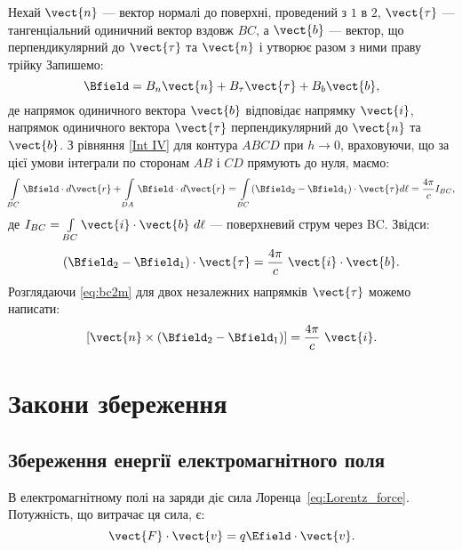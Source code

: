 Нехай $\vect{n}$ --- вектор нормалі до поверхні, проведений з $1$ в $2$,  $\vect{\tau}$ --- тангенціальний одиничний вектор вздовж $BC$, а $\vect{b}$
--- вектор, що перпендикулярний до $\vect{\tau}$ та $\vect{n}$ і утворює разом з ними праву трійку
Запишемо:
\begin{equation*}
    \Bfield = B_n\vect{n} + B_{\tau}\vect{\tau} + B_b\vect{b},
\end{equation*}
де напрямок одиничного вектора $\vect{b}$ відповідає напрямку $\vect{i}$, напрямок
одиничного вектора $\vect{\tau}$ перпендикулярний до $\vect{n}$ та $\vect{b}$.
З рівняння \eqref {Int IV} для контура $ABCD$ при $h \to 0$, враховуючи, що за цієї
умови інтеграли по сторонам $AB$ і $CD$ прямують до нуля, маємо:
\begin{equation*}
    \int\limits_{BC} \Bfield\cdot d\vect{r} + \int\limits_{DA} \Bfield\cdot d\vect{r} = \int\limits_{BC} (\Bfield_2 - \Bfield_1)\cdot\vect{\tau} d\ell =
    \frac{4\pi}c I_{BC},
\end{equation*}
де $I_{BC} = \int\limits_{BC} \vect{i}\cdot\vect{b}\ d\ell$ --- поверхневий струм через BC. Звідси:
\begin{equation}\label{eq:bc2m}
    (\Bfield_2 - \Bfield_1)\cdot\vect{\tau} = \frac{4\pi}c\ \vect{i}\cdot\vect{b}.
\end{equation}
Розглядаючи \eqref{eq:bc2m} для двох незалежних напрямків $\vect{\tau}$ можемо написати:
\begin{equation}\label{eq:bc2m2}
    \left[ \vect{n}\times(\Bfield_2 - \Bfield_1)\right]  = \frac{4\pi}c\ \vect{i}.
\end{equation}



\section{Закони збереження}


\subsection*{Збереження енергії електромагнітного поля}


В електромагнітному полі на заряди діє сила Лоренца~\eqref{eq:Lorentz_force}. Потужність,
що витрачає ця сила, є:
\begin{equation*}
    \vect{F}\cdot\vect{v} = q\Efield\cdot\vect{v}.
\end{equation*}

